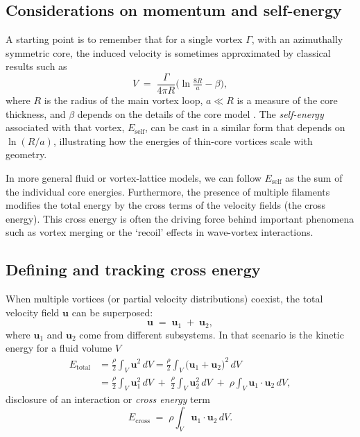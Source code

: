 \documentclass[preprint]{revtex4-2}
\begin{document}
\subsection{Considerations on momentum and self-energy}
\label{sec:momentum}
A starting point is to remember that for a single vortex $\Gamma$, with an
azimuthally symmetric core, the induced velocity is sometimes approximated by
classical results such as
\begin{equation}
   V \;=\; \frac{\Gamma}{4 \pi R}
   \bigl(\ln \tfrac{8 R}{a} - \beta \bigr),\label{eq:appendix:velocity}
\end{equation}
where $R$ is the radius of the main vortex loop, $a \ll R$ is a measure of the core thickness,
and $\beta$ depends on the details of the core model \cite{Saffman1992}. The
\emph{self-energy} associated with that vortex, $E_\text{self}$, can be cast in a
similar form that depends on $\ln(R/a)$, illustrating how the energies of thin-core vortices
scale with geometry.

In more general fluid or vortex-lattice models, we can follow $E_\text{self}$ as the
sum of the individual core energies. Furthermore, the presence of multiple filaments
modifies the total energy by the cross terms of the velocity fields (the cross energy). This
cross energy is often the driving force behind important phenomena such as vortex merging or the `recoil' effects
in wave-vortex interactions.

\subsection{Defining and tracking cross energy}
\label{sec:cross}
When multiple vortices (or partial velocity distributions) coexist, the total velocity field $\mathbf{u}$ can be superposed:
\begin{equation}
   \mathbf{u} \;=\; \mathbf{u}_1 \;+\;\mathbf{u}_2,\label{eq:appendix:superpose}
\end{equation}
where $\mathbf{u}_1$ and $\mathbf{u}_2$ come from different subsystems. In that
scenario is the kinetic energy for a fluid volume $V$
\begin{align}
   E_\text{total} &= \frac{\rho}{2} \int_V \mathbf{u}^2 \,dV
   = \frac{\rho}{2} \int_V \bigl(\mathbf{u}_1 + \mathbf{u}_2 \bigr)^2\, dV \\
   &= \frac{\rho}{2} \int_V \mathbf{u}_1^2 \,dV \;+\;\frac{\rho}{2} \int_V \mathbf{u}_2^2 \,dV
   \;+\;\rho \int_V \mathbf{u}_1 \cdot \mathbf{u}_2 \, dV,
\end{align}
disclosure of an interaction or \emph{cross energy} term
\begin{equation}
   E_\text{cross} \;=\; \rho \int_V \mathbf{u}_1 \cdot \mathbf{u}_2 \, dV.
   \label{eq:cross-term}
\end{equation}
\end{document}
